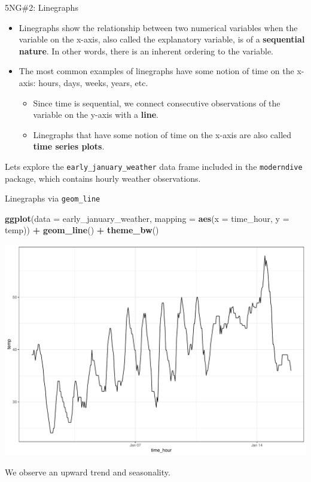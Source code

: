 \documentclass[
  ignorenonframetext,
]{beamer}
\newenvironment{Shaded}{\begin{snugshade}}{\end{snugshade}}
\newcommand{\AttributeTok}[1]{\textcolor[rgb]{0.13,0.29,0.53}{#1}}
\newcommand{\FunctionTok}[1]{\textcolor[rgb]{0.13,0.29,0.53}{\textbf{#1}}}
\newcommand{\NormalTok}[1]{#1}
\newcommand{\SpecialCharTok}[1]{\textcolor[rgb]{0.81,0.36,0.00}{\textbf{#1}}}
\providecommand{\tightlist}{%
  \setlength{\itemsep}{0pt}\setlength{\parskip}{0pt}}
\begin{document}
\begin{frame}[fragile]{5NG\#2: Linegraphs}
\protect\hypertarget{ng2-linegraphs}{}
\begin{itemize}
\item
  Linegraphs show the relationship between two numerical variables when
  the variable on the x-axis, also called the explanatory variable, is
  of a \textbf{sequential nature}. In other words, there is an inherent
  ordering to the variable.
\item
  The most common examples of linegraphs have some notion of time on the
  x-axis: hours, days, weeks, years, etc.

  \begin{itemize}
  \tightlist
  \item
    Since time is sequential, we connect consecutive observations of the
    variable on the y-axis with a \textbf{line}.
  \item
    Linegraphs that have some notion of time on the x-axis are also
    called \textbf{time series plots}.
  \end{itemize}
\end{itemize}

Lets explore the \texttt{early\_january\_weather} data frame included in
the \texttt{moderndive} package, which contains hourly weather
observations.
\end{frame}

\begin{frame}[fragile]{Linegraphs via \texttt{geom\_line}}
\protect\hypertarget{linegraphs-via-geom_line}{}
\tiny

\begin{Shaded}
\begin{Highlighting}[]
\FunctionTok{ggplot}\NormalTok{(}\AttributeTok{data =}\NormalTok{ early\_january\_weather, }
       \AttributeTok{mapping =} \FunctionTok{aes}\NormalTok{(}\AttributeTok{x =}\NormalTok{ time\_hour, }\AttributeTok{y =}\NormalTok{ temp)) }\SpecialCharTok{+}
  \FunctionTok{geom\_line}\NormalTok{() }\SpecialCharTok{+} 
  \FunctionTok{theme\_bw}\NormalTok{()}
\end{Highlighting}
\end{Shaded}

\begin{center}\includegraphics[width=0.7\linewidth,height=0.5\textheight]{Week2_Lect_files/figure-beamer/unnamed-chunk-24-1} \end{center}
\normalsize

We observe an upward trend and seasonality.
\end{frame}
\end{document}
